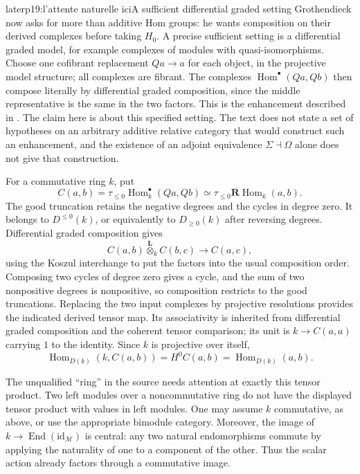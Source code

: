 \begin{dcomment}{later}{p19:l'attente naturelle ici}{A sufficient differential graded setting}
Grothendieck now asks for more than additive Hom groups: he wants composition on their derived complexes before taking $H_0$. A precise sufficient setting is a differential graded model, for example complexes of modules with quasi-isomorphisms. Choose one cofibrant replacement $Qa\to a$ for each object, in the projective model structure; all complexes are fibrant. The complexes $\operatorname{Hom}^\bullet(Qa,Qb)$ then compose literally by differential graded composition, since the middle representative is the same in the two factors. This is the enhancement described in \citet[\S\S2.2 and 3.2]{Keller2006DG}. The claim here is about this specified setting. The text does not state a set of hypotheses on an arbitrary additive relative category that would construct such an enhancement, and the existence of an adjoint equivalence $\Sigma\dashv\Omega$ alone does not give that construction.

For a commutative ring $k$, put
\[
 C(a,b)=\tau_{\leq0}\operatorname{Hom}^\bullet_k(Qa,Qb)
       \simeq\tau_{\leq0}\mathbf R\operatorname{Hom}_k(a,b).
\]
The good truncation retains the negative degrees and the cycles in degree zero. It belongs to $D^{\leq0}(k)$, or equivalently to $D_{\geq0}(k)$ after reversing degrees. Differential graded composition gives
\[
 C(a,b)\mathbin{\overset{\mathbf L}{\otimes}}_k C(b,c)
       \longrightarrow C(a,c),
\]
using the Koszul interchange to put the factors into the usual composition order. Composing two cycles of degree zero gives a cycle, and the sum of two nonpositive degrees is nonpositive, so composition restricts to the good truncations. Replacing the two input complexes by projective resolutions provides the indicated derived tensor map. Its associativity is inherited from differential graded composition and the coherent tensor comparison; its unit is $k\to C(a,a)$ carrying $1$ to the identity. Since $k$ is projective over itself,
\[
 \operatorname{Hom}_{D(k)}(k,C(a,b))=H^0C(a,b)
 =\operatorname{Hom}_{D(k)}(a,b).
\]

The unqualified ``ring'' in the source needs attention at exactly this tensor product. Two left modules over a noncommutative ring do not have the displayed tensor product with values in left modules. One may assume $k$ commutative, as above, or use the appropriate bimodule category. Moreover, the image of $k\to\operatorname{End}(\mathrm{id}_{\mathcal M})$ is central: any two natural endomorphisms commute by applying the naturality of one to a component of the other. Thus the scalar action already factors through a commutative image.


\end{dcomment}
